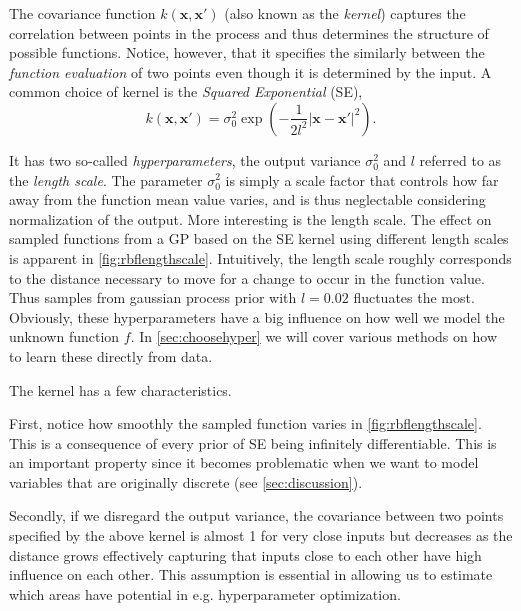 \documentclass[conference,compsoc]{IEEEtran}
\theoremstyle{definition}
\begin{document}

            The covariance function $k(\bm{x},\bm{x}')$ (also known as the \emph{kernel}) captures the correlation between points in the process and thus determines the structure of possible functions.
            Notice, however, that it specifies the similarly between the \emph{function evaluation} of two points even though it is determined by the input.
            A common choice of kernel is the \emph{Squared Exponential} (SE),
            \begin{equation}
                k(\bm{x},\bm{x}') = \sigma_0^2 \exp (-\frac{1}{2 l^2} |\bm{x} - \bm{x}'| ^ 2).
            \end{equation}

            It has two so-called \emph{hyperparameters}, the output variance $\sigma_0^2$ and $l$ referred to as the \emph{length scale}.
            The parameter $\sigma_0^2$ is simply a scale factor that controls how far away from the function mean value varies, and is thus neglectable considering normalization of the output. %
            More interesting is the length scale.
            The effect on sampled functions from a GP based on the SE kernel using different length scales is apparent in \cref{fig:rbflengthscale}.
            Intuitively, the length scale roughly corresponds to the distance necessary to move for a change to occur in the function value.
            Thus samples from gaussian process prior with $l=0.02$ fluctuates the most.
            Obviously, these hyperparameters have a big influence on how well we model the unknown function $f$.
            In \cref{sec:choosehyper} we will cover various methods on how to learn these directly from data.
            
            The kernel has a few characteristics.
            
            First, notice how smoothly the sampled function varies in \cref{fig:rbflengthscale}.
            This is a consequence of every prior of SE being infinitely differentiable. 
            This is an important property since it becomes problematic when we want to model variables that are originally discrete (see \cref{sec:discussion}).

            Secondly, if we disregard the output variance, the covariance between two points specified by the above kernel is almost 1 for very close inputs but decreases as the distance grows effectively capturing that inputs close to each other have high influence on each other.
            This assumption is essential in allowing us to estimate which areas have potential in e.g. hyperparameter optimization.
\end{document}
